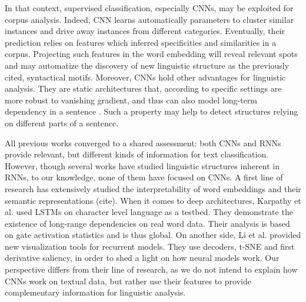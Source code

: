 In that context, supervised classification, especially CNNs, may be exploited for corpus analysis. Indeed, CNN learns automatically parameters to cluster similar instances and drive away instances from different categories. Eventually, their prediction relies on features which inferred specificities and similarities in a corpus. Projecting such features in the word embedding will reveal relevant spots and may automatize the discovery of new linguistic structure as the previously cited, syntactical motifs. Moreover, CNNs hold other advantages for linguistic analysis. They are static architectures that, according to specific settings are more robust to vanishing gradient, 
and thus can also model long-term dependency in a sentence \cite{dauphin2017language,wen2017network, adel2017global}. Such a property may help to detect structures relying on different parts of a sentence.


 All previous works converged to a shared assessment: both CNNs and RNNs provide relevant, but different kinds of information for text classification. 
 However, though several works have studied linguistic structures inherent in RNNs, to our knowledge, none of them have focused on CNNs. 
 A first line of research has extensively studied the interpretability of word embeddings and their semantic representations (cite). 
 When it comes to deep architectures, Karpathy et al. \cite{karpathy2015visualizing} used LSTMs on character level language as a testbed. They demonstrate the existence of 
 long-range dependencies on real word data. Their analysis is based on gate activation statistics and is thus global. On another side, Li et al. \cite{li2015visualizing}
 provided new visualization tools for recurrent models. They use decoders, t-SNE and first derivative saliency, in order to shed a light on how neural models work.
Our perspective differs from their line of research, as we do not intend to explain how CNNs work on textual data, but rather use their features 
to provide complementary information for linguistic analysis.

